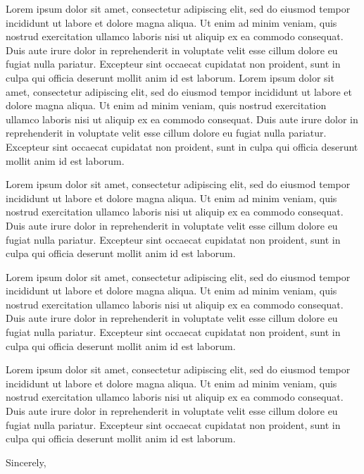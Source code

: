 \documentclass[12pt,sigleft,dateno,stdletter]{newlfm}
\begin{document}
\begin{newlfm}
Lorem ipsum dolor sit amet, consectetur adipiscing elit, sed do eiusmod tempor incididunt ut labore et dolore magna aliqua.
Ut enim ad minim veniam, quis nostrud exercitation ullamco laboris nisi ut aliquip ex ea commodo consequat. 
Duis aute irure dolor in reprehenderit in voluptate velit esse cillum dolore eu fugiat nulla pariatur. 
Excepteur sint occaecat cupidatat non proident, sunt in culpa qui officia deserunt mollit anim id est laborum. 
Lorem ipsum dolor sit amet, consectetur adipiscing elit, sed do eiusmod tempor incididunt ut labore et dolore magna aliqua.
Ut enim ad minim veniam, quis nostrud exercitation ullamco laboris nisi ut aliquip ex ea commodo consequat. 
Duis aute irure dolor in reprehenderit in voluptate velit esse cillum dolore eu fugiat nulla pariatur. 
Excepteur sint occaecat cupidatat non proident, sunt in culpa qui officia deserunt mollit anim id est laborum. 

Lorem ipsum dolor sit amet, consectetur adipiscing elit, sed do eiusmod tempor incididunt ut labore et dolore magna aliqua.
Ut enim ad minim veniam, quis nostrud exercitation ullamco laboris nisi ut aliquip ex ea commodo consequat. 
Duis aute irure dolor in reprehenderit in voluptate velit esse cillum dolore eu fugiat nulla pariatur. 
Excepteur sint occaecat cupidatat non proident, sunt in culpa qui officia deserunt mollit anim id est laborum. 

Lorem ipsum dolor sit amet, consectetur adipiscing elit, sed do eiusmod tempor incididunt ut labore et dolore magna aliqua.
Ut enim ad minim veniam, quis nostrud exercitation ullamco laboris nisi ut aliquip ex ea commodo consequat. 
Duis aute irure dolor in reprehenderit in voluptate velit esse cillum dolore eu fugiat nulla pariatur. 
Excepteur sint occaecat cupidatat non proident, sunt in culpa qui officia deserunt mollit anim id est laborum. 

Lorem ipsum dolor sit amet, consectetur adipiscing elit, sed do eiusmod tempor incididunt ut labore et dolore magna aliqua.
Ut enim ad minim veniam, quis nostrud exercitation ullamco laboris nisi ut aliquip ex ea commodo consequat. 
Duis aute irure dolor in reprehenderit in voluptate velit esse cillum dolore eu fugiat nulla pariatur. 
Excepteur sint occaecat cupidatat non proident, sunt in culpa qui officia deserunt mollit anim id est laborum. \\
\par
Sincerely,\par
\end{newlfm}
\end{document}

